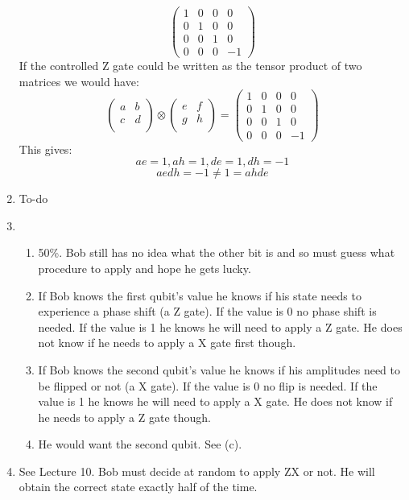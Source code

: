 \documentclass[12pt]{article}
\begin{document}
\begin{enumerate}[font=\bfseries]
    \[\begin{pmatrix}
    1 & 0 & 0 & 0 \\
    0 & 1 & 0 & 0 \\
    0 & 0 & 1 & 0 \\
    0 & 0 & 0 & -1
    \end{pmatrix}
    \]
    If the controlled Z gate could be written as the tensor product of two matrices we would have:
    \[
    \begin{pmatrix}
    a & b  \\
    c & d  \\
    \end{pmatrix}
    \otimes
    \begin{pmatrix}
    e & f  \\
    g & h  \\
    \end{pmatrix}
    =
    \begin{pmatrix}
    1 & 0 & 0 & 0 \\
    0 & 1 & 0 & 0 \\
    0 & 0 & 1 & 0 \\
    0 & 0 & 0 & -1
    \end{pmatrix}
    \]
    This gives:
    \[ae = 1, ah = 1, de = 1, dh = -1\]
    \[aedh = -1 \neq 1 = ahde\]
    \item To-do
    \item \begin{enumerate}
        \item 50\%. Bob still has no idea what the other bit is and so must guess what procedure to apply and hope he gets lucky.
        \item If Bob knows the first qubit's value he knows if his state needs to experience a phase shift (a Z gate). If the value is 0 no phase shift is needed. If the value is 1 he knows he will need to apply a Z gate. He does not know if he needs to apply a X gate first though.
        \item If Bob knows the second qubit's value he knows if his amplitudes need to be flipped or not (a X gate). If the value is 0 no flip is needed. If the value is 1 he knows he will need to apply a X gate. He does not know if he needs to apply a Z gate though.
        \item He would want the second qubit. See (c).
    \end{enumerate}
    \item See Lecture 10. Bob must decide at random to apply ZX or not. He will obtain the correct state exactly half of the time.

\end{enumerate}
\end{document}
